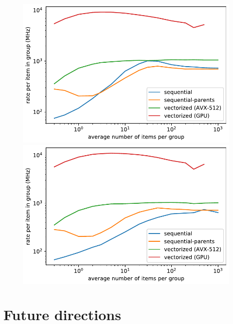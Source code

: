 \documentclass{webofc}
\begin{document}






\begin{figure}
\includegraphics[width=0.5\linewidth]{sum_rates_logy.pdf}\includegraphics[width=0.5\linewidth]{max_rates_logy.pdf}

\caption{\label{rates_logy}}
\end{figure}

\section{Future directions}
\end{document}
